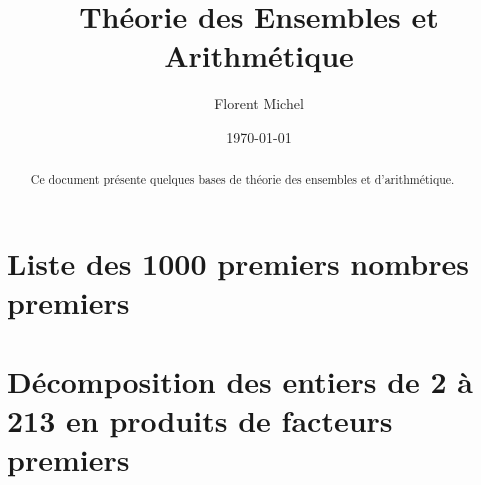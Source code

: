 
\usepackage{splitidx}
\newcommand{\aindex}[1]{#1\index{#1}} %
\makeindex
{}
 
\title{Théorie des Ensembles et Arithmétique}
\date{\today}
\author{%
Florent Michel \\ 
\Fstar} 

\newcommand{\inbox}[1]{\begin{tikzpicture}[baseline=-0.7ex, inner sep=0.5ex] \node[draw] {#1\vphantom{0123456789}}; \end{tikzpicture}}

 
\date{}
\maketitle 
\begin{abstract}
Ce document présente quelques bases de théorie des ensembles et d'arithmétique.
\end{abstract}
\bigskip
\begin{multicols}{2}
\renewcommand{\contentsname}{Table des matières}
\tableofcontents 
\end{multicols}

\clearpage



\clearpage



\clearpage



\clearpage

\appendix



\clearpage

\section{Liste des 1000 premiers nombres premiers} 

\noindent\textsf{}

\clearpage

\section{Décomposition des entiers de 2 à 213 en produits de facteurs premiers}

